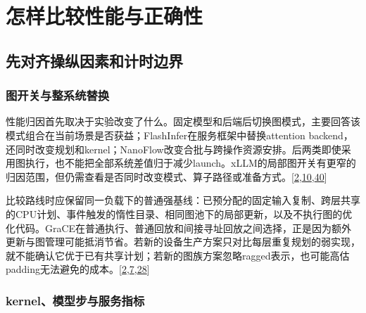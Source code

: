 \documentclass[
  UTF8,
  zihao=5]{ctexart}
\begin{document}
\hypertarget{ux600eux6837ux6bd4ux8f83ux6027ux80fdux4e0eux6b63ux786eux6027}{%
\section{怎样比较性能与正确性}\label{ux600eux6837ux6bd4ux8f83ux6027ux80fdux4e0eux6b63ux786eux6027}}

\hypertarget{ux5148ux5bf9ux9f50ux64cdux7eb5ux56e0ux7d20ux548cux8ba1ux65f6ux8fb9ux754c}{%
\subsection{先对齐操纵因素和计时边界}\label{ux5148ux5bf9ux9f50ux64cdux7eb5ux56e0ux7d20ux548cux8ba1ux65f6ux8fb9ux754c}}

\hypertarget{ux56feux5f00ux5173ux4e0eux6574ux7cfbux7edfux66ffux6362}{%
\subsubsection{图开关与整系统替换}\label{ux56feux5f00ux5173ux4e0eux6574ux7cfbux7edfux66ffux6362}}

性能归因首先取决于实验改变了什么。固定模型和后端后切换图模式，主要回答该模式组合在当前场景是否获益；FlashInfer在服务框架中替换attention
backend，还同时改变规划和kernel；NanoFlow改变合批与跨操作资源安排。后两类即使采用图执行，也不能把全部系统差值归于减少launch。xLLM的局部图开关有更窄的归因范围，但仍需查看是否同时改变模式、算子路径或准备方式。{[}\protect\hyperlink{ref-ye2025flashinfer}{2},\protect\hyperlink{ref-liu2025xllm}{10},\protect\hyperlink{ref-zhu2025nanoflow}{40}{]}

比较路线时应保留同一负载下的普通强基线：已预分配的固定输入复制、跨层共享的CPU计划、事件触发的惰性目录、相同图池下的局部更新，以及不执行图的优化代码。GraCE在普通执行、普通回放和间接寻址回放之间选择，正是因为额外更新与图管理可能抵消节省。若新的设备生产方案只对比每层重复规划的弱实现，就不能确认它优于已有共享计划；若新的图族方案忽略ragged表示，也可能高估padding无法避免的成本。{[}\protect\hyperlink{ref-ye2025flashinfer}{2},\protect\hyperlink{ref-ye2024chunkattention}{7},\protect\hyperlink{ref-ghosh2026grace}{28}{]}

\hypertarget{kernelux6a21ux578bux6b65ux4e0eux670dux52a1ux6307ux6807}{%
\subsubsection{kernel、模型步与服务指标}\label{kernelux6a21ux578bux6b65ux4e0eux670dux52a1ux6307ux6807}}
\end{document}
